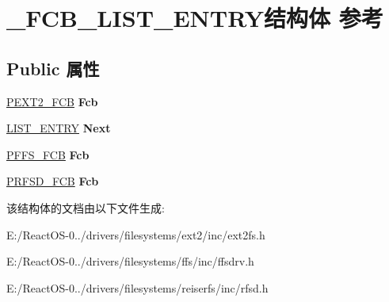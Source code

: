 \hypertarget{struct___f_c_b___l_i_s_t___e_n_t_r_y}{}\section{\+\_\+\+F\+C\+B\+\_\+\+L\+I\+S\+T\+\_\+\+E\+N\+T\+R\+Y结构体 参考}
\label{struct___f_c_b___l_i_s_t___e_n_t_r_y}
\subsection*{Public 属性}
\begin{DoxyCompactItemize}
\item 
\mbox{\label{struct___f_c_b___l_i_s_t___e_n_t_r_y_a37cc3dc36c9b7cfa7e2e6428134fefd9}} 
\hyperlink{struct___e_x_t2___f_c_b}{P\+E\+X\+T2\+\_\+\+F\+CB} {\bfseries Fcb}
\item 
\mbox{\label{struct___f_c_b___l_i_s_t___e_n_t_r_y_aec1aee78af5d22eed1aebed1e80fa263}} 
\hyperlink{struct___l_i_s_t___e_n_t_r_y}{L\+I\+S\+T\+\_\+\+E\+N\+T\+RY} {\bfseries Next}
\item 
\mbox{\label{struct___f_c_b___l_i_s_t___e_n_t_r_y_a28a8807f48810ef176cf313a78119782}} 
\hyperlink{struct___f_f_s___f_c_b}{P\+F\+F\+S\+\_\+\+F\+CB} {\bfseries Fcb}
\item 
\mbox{\label{struct___f_c_b___l_i_s_t___e_n_t_r_y_a28f9285f2a210e2f3d6cbdb213780722}} 
\hyperlink{struct___r_f_s_d___f_c_b}{P\+R\+F\+S\+D\+\_\+\+F\+CB} {\bfseries Fcb}
\end{DoxyCompactItemize}


该结构体的文档由以下文件生成\+:\begin{DoxyCompactItemize}
\item 
E\+:/\+React\+O\+S-\/0../drivers/filesystems/ext2/inc/ext2fs.\+h\item 
E\+:/\+React\+O\+S-\/0../drivers/filesystems/ffs/inc/ffsdrv.\+h\item 
E\+:/\+React\+O\+S-\/0../drivers/filesystems/reiserfs/inc/rfsd.\+h\end{DoxyCompactItemize}
